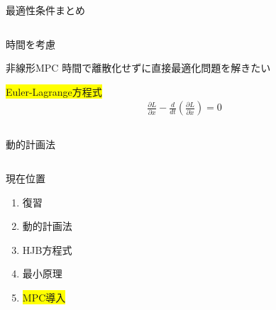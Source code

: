 \documentclass[twocolumn, dvipdfmx,12pt]{beamer}
\begin{document}
\begin{frame}{最適性条件まとめ}
\begin{columns}
            \begin{column}{.55\textwidth}
                \begin{itembox}[l]{時間を考慮}
                    \begin{itembox}[l]{非線形MPC}
                        時間で離散化せずに直接最適化問題を解きたい
                    \end{itembox}
                    \colorbox{yellow}{Euler-Lagrange方程式}\\
                    \begin{align*}
                        \frac{\partial L}{\partial x} - \frac{d}{dt} \left( \frac{\partial L}{\partial \dot{x}} \right) = 0
                    \end{align*}
                    \begin{columns}
                        \begin{column}{.5\textwidth}
                            \begin{center}
                                \begin{itembox}[l]{動的計画法}
                                \end{itembox}
                            \end{center}
                        \end{column}
                        \begin{column}{.5\textwidth}
                        \end{column}
                    \end{columns}
                    
                \end{itembox}
            \end{column}
        \end{columns}
    \end{frame}

    \begin{frame}{現在位置}
        \footnotesize
        \begin{enumerate}
            \item 復習
            \item 動的計画法
            \item HJB方程式
            \item 最小原理
            \item \colorbox{yellow}{MPC導入}
        \end{enumerate}
    \end{frame}
\end{document}
